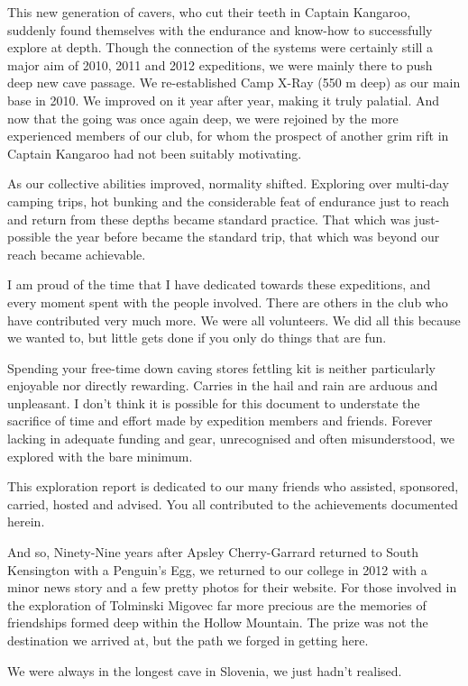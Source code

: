 This new generation of cavers, who cut their teeth in Captain Kangaroo,
suddenly found themselves with the endurance and know-how to
successfully explore at depth. Though the connection of the systems were
certainly still a major aim of 2010, 2011 and 2012 expeditions, we were
mainly there to push deep new cave passage. We re-established Camp X-Ray
(550 m deep) as our main base in 2010. We improved on it year after
year, making it truly palatial. And now that the going was once again
deep, we were rejoined by the more experienced members of our club, for
whom the prospect of another grim rift in Captain Kangaroo had not been
suitably motivating.

As our collective abilities improved, normality shifted. Exploring over
multi-day camping trips, hot bunking and the considerable feat of
endurance just to reach and return from these depths became standard
practice. That which was just-possible the year before became the
standard trip, that which was beyond our reach became achievable.

I am proud of the time that I have dedicated towards these expeditions,
and every moment spent with the people involved. There are others in the
club who have contributed very much more. We were all volunteers. We did
all this because we wanted to, but little gets done if you only do
things that are fun.

Spending your free-time down caving stores fettling kit is neither
particularly enjoyable nor directly rewarding. Carries in the hail and
rain are arduous and unpleasant. I don't think it is possible for this
document to understate the sacrifice of time and effort made by
expedition members and friends. Forever lacking in adequate funding and
gear, unrecognised and often misunderstood, we explored with the bare
minimum.

This exploration report is dedicated to our many friends who assisted,
sponsored, carried, hosted and advised. You all contributed to the
achievements documented herein.

And so, Ninety-Nine years after Apsley Cherry-Garrard returned to South
Kensington with a Penguin's Egg, we returned to our college in 2012 with
a minor news story and a few pretty photos for their website. For those
involved in the exploration of Tolminski Migovec far more precious are
the memories of friendships formed deep within the Hollow Mountain. The
prize was not the destination we arrived at, but the path we forged in
getting here.

We were always in the longest cave in Slovenia, we just hadn't realised.


